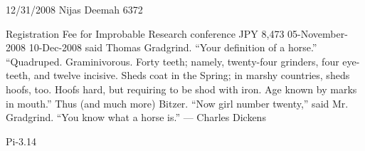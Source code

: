 \documentclass[a4,14pt]{form3}
\begin{document}
\sealbox %

  \appdetails
  { 12/31/2008}   %
  {Nijas  Deemah} %
  {6372} %

\begin{report}
  \details
      {Registration Fee for Improbable Research conference}
      {JPY 8,473}         %
      {05-November-2008}  %
      {10-Dec-2008}        %
      { said Thomas Gradgrind. “Your definition of a horse.” “Quadruped. Graminivorous. Forty teeth; namely, twenty-four grinders, four eye-teeth, and twelve incisive. Sheds coat in the Spring; in marshy countries, sheds hoofs, too. Hoofs hard, but requiring to be shod with iron. Age known by marks in mouth.” Thus (and much more) Bitzer. “Now girl number twenty,” said Mr. Gradgrind. “You know what a horse is.” --- Charles Dickens}   %
\end{report}

\begin{misc}
  \miscbudget
      {Pi-3.14}  %
\end{misc}
\end{document}
